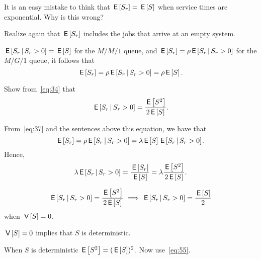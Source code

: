 \begin{extra}
  It is an easy mistake to think that $\E{S_r} = \E S$ when service
  times are exponential. Why is this wrong?
\begin{hint}
Realize again that $\E{S_r}$ includes the jobs that arrive at an empty system.
\end{hint}
\begin{solution}

    $\E{S_r \given S_r>0} = \E S$ for the $M/M/1$ queue, and
    $\E{S_r} = \rho \E{S_r \given S_r>0}$ for the $M/G/1$ queue, it
    follows that
  \begin{equation*}
 \E{S_r} = \rho \E{S_r\given S_r>0} = \rho \E S.
  \end{equation*}
\end{solution}
\end{extra}




\begin{exercise} \label{ex:9}
Show from~\cref{eq:34} that 
\begin{equation}\label{eq:55}
\E{S_r\given S_r>0} = \frac{\E{S^2}}{2 \E S}.
\end{equation}
\begin{solution}
 From~\cref{eq:37} and the sentences above this equation,
    we have that
    \begin{equation*}
    \E{S_r} = \rho \E{S_r\given S_r>0}=\lambda \E S \E{S_r\given S_r>0}.
    \end{equation*}
Hence,
    \begin{equation*}
    \lambda \E{S_r\given S_r>0} = \frac{\E{S_r}}{\E S} = \lambda \frac{\E{S^2}}{2 \E S}.
    \end{equation*}
\end{solution}
\end{exercise}


\begin{extra}[\faBalanceScale]\label{ex:45}
\begin{equation*}
\E{S_r\given S_r>0} = \frac{\E{S^2}}{2 \E S} \implies \E {S_r\given S_r>0} = \frac{\E S} 2
\end{equation*}
when $\V{S} = 0$. 
\begin{hint}
    $\V S = 0$ implies that $S$ is deterministic.
\end{hint}
\begin{solution}
 When $S$ is deterministic $\E{S^2} = (\E{S})^2$.  Now use~\cref{eq:55}.
\end{solution}
\end{extra}

